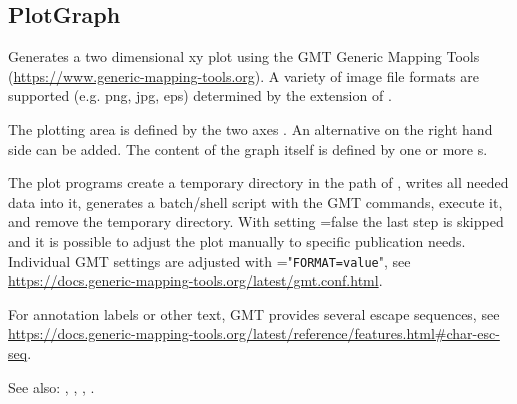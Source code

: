 \clearpage
\subsection{PlotGraph}\label{PlotGraph}
Generates a two dimensional xy plot using the GMT Generic Mapping Tools (\url{https://www.generic-mapping-tools.org}).
A variety of image file formats are supported (e.g. png, jpg, eps) determined by the extension of .

The plotting area is defined by the two axes . An alternative 
on the right hand side can be added. The content of the graph itself is defined
by one or more s.

The plot programs create a temporary directory in the path of , writes all needed data into it,
generates a batch/shell script with the GMT commands, execute it, and remove the temporary directory.
With setting =false the last step is skipped and it is possible to adjust the plot manually
to specific publication needs. Individual GMT settings are adjusted with ="\verb|FORMAT=value|",
see \url{https://docs.generic-mapping-tools.org/latest/gmt.conf.html}.

For annotation labels or other text, GMT provides several escape sequences, see
\url{https://docs.generic-mapping-tools.org/latest/reference/features.html#char-esc-seq}.

See also: , , , .


